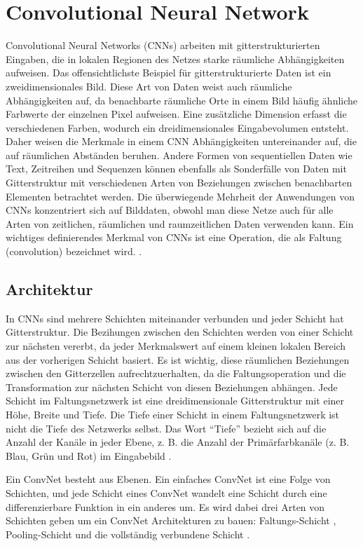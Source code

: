   \section{Convolutional Neural Network}
  Convolutional Neural Networks (CNNs) arbeiten mit gitterstrukturierten Eingaben, die in lokalen Regionen des Netzes starke räumliche Abhängigkeiten aufweisen. Das offensichtlichste Beispiel für gitterstrukturierte Daten ist ein zweidimensionales Bild. Diese Art von Daten weist auch räumliche Abhängigkeiten auf, da benachbarte räumliche Orte in einem Bild häufig ähnliche Farbwerte der einzelnen Pixel aufweisen. Eine zusätzliche Dimension erfasst die verschiedenen Farben, wodurch ein dreidimensionales Eingabevolumen entsteht. Daher weisen die Merkmale in einem CNN Abhängigkeiten untereinander auf, die auf räumlichen Abständen beruhen. Andere Formen von sequentiellen Daten wie Text, Zeitreihen und Sequenzen können ebenfalls als Sonderfälle von Daten mit Gitterstruktur mit verschiedenen Arten von Beziehungen zwischen benachbarten Elementen betrachtet werden. Die überwiegende Mehrheit der Anwendungen von CNNs konzentriert sich auf Bilddaten, obwohl man diese Netze auch für alle Arten von zeitlichen, räumlichen und raumzeitlichen Daten verwenden kann. Ein wichtiges definierendes Merkmal von CNNs ist eine Operation, die als Faltung (convolution) bezeichnet wird. \cite*[315-316]{Aggarwal2018}.

  \subsection{Architektur}
  In CNNs sind mehrere Schichten miteinander verbunden und jeder Schicht hat  Gitterstruktur. Die Bezihungen zwischen den Schichten werden von einer Schicht zur nächsten vererbt, da jeder Merkmalswert auf einem kleinen lokalen Bereich aus der vorherigen Schicht basiert. Es ist wichtig, diese räumlichen Beziehungen zwischen den Gitterzellen aufrechtzuerhalten, da die Faltungsoperation und die Transformation zur nächsten Schicht von diesen Beziehungen abhängen. Jede Schicht im Faltungsnetzwerk ist eine dreidimensionale Gitterstruktur mit einer Höhe, Breite und Tiefe. Die Tiefe einer Schicht in einem Faltungsnetzwerk ist nicht die Tiefe des Netzwerks selbst. Das Wort \enquote{Tiefe} bezieht sich auf die Anzahl der Kanäle in jeder Ebene, z. B. die Anzahl der Primärfarbkanäle (z. B. Blau, Grün und Rot) im Eingabebild \cite*[318]{Aggarwal2018}.

  Ein ConvNet besteht aus Ebenen. Ein einfaches ConvNet ist eine Folge von Schichten, und jede Schicht eines ConvNet wandelt eine Schicht durch eine differenzierbare Funktion in ein anderes um. Es wird dabei drei Arten von Schichten geben um ein ConvNet Architekturen zu bauen: Faltungs-Schicht , Pooling-Schicht und die vollständig verbundene Schicht \cite*{StanfordUniversityCoursecs231n2018a}.

